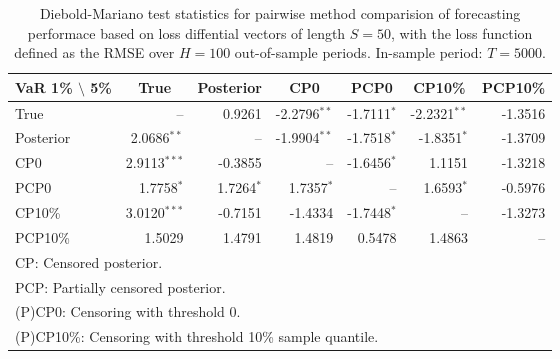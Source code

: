 { \renewcommand{\arraystretch}{1.2} 
\begin{table}[!ht] 
\center 
\begin{tabular}{l | rrr rrr} 
VaR 1\% $\setminus$ 5\% & \multicolumn{1}{c}{True} & \multicolumn{1}{c}{Posterior} & \multicolumn{1}{c}{CP0} & \multicolumn{1}{c}{PCP0} & \multicolumn{1}{c}{CP10\%} & \multicolumn{1}{c}{PCP10\%} \\ \hline 
True &    --\phantom{$^{***}$} & 0.9261\phantom{$^{***}$} & -2.2796$^{**}$\phantom{$^{*}$} & -1.7111$^{*}$\phantom{$^{**}$} & -2.2321$^{**}$\phantom{$^{*}$} & -1.3516\phantom{$^{***}$}  \\ 
Posterior & 2.0686$^{**}$\phantom{$^{*}$} &    --\phantom{$^{***}$} & -1.9904$^{**}$\phantom{$^{*}$} & -1.7518$^{*}$\phantom{$^{**}$} & -1.8351$^{*}$\phantom{$^{**}$} & -1.3709\phantom{$^{***}$}  \\ 
CP0 & 2.9113$^{***}$ & -0.3855\phantom{$^{***}$} &    --\phantom{$^{***}$} & -1.6456$^{*}$\phantom{$^{**}$} & 1.1151\phantom{$^{***}$} & -1.3218\phantom{$^{***}$}  \\ 
PCP0 & 1.7758$^{*}$\phantom{$^{**}$} & 1.7264$^{*}$\phantom{$^{**}$} & 1.7357$^{*}$\phantom{$^{**}$} &    --\phantom{$^{***}$} & 1.6593$^{*}$\phantom{$^{**}$} & -0.5976\phantom{$^{***}$}  \\ 
CP10\% & 3.0120$^{***}$ & -0.7151\phantom{$^{***}$} & -1.4334\phantom{$^{***}$} & -1.7448$^{*}$\phantom{$^{**}$} &    --\phantom{$^{***}$} & -1.3273\phantom{$^{***}$}  \\ 
PCP10\% & 1.5029\phantom{$^{***}$} & 1.4791\phantom{$^{***}$} & 1.4819\phantom{$^{***}$} & 0.5478\phantom{$^{***}$} & 1.4863\phantom{$^{***}$} &    --\phantom{$^{***}$}  \\ 
\hline 
\multicolumn{7}{l}{\footnotesize{CP: Censored posterior.}}  \\ 
\multicolumn{7}{l}{\footnotesize{PCP: Partially censored posterior.}} \\ 
\multicolumn{7}{l}{\footnotesize{(P)CP0: Censoring with threshold 0.}} \\ 
\multicolumn{7}{l}{\footnotesize{(P)CP10\%: Censoring with threshold 10\% sample quantile.}}  \\ 
\end{tabular}
 \caption{Diebold-Mariano test statistics for  pairwise method comparision of forecasting performace based on loss diffential vectors of length $S = 50$, with the loss function defined as the RMSE over $H=100$ out-of-sample periods. In-sample period: $T = 5000$.} 
\label{tab:garch11_DM_T_5000}  
\end{table}
}